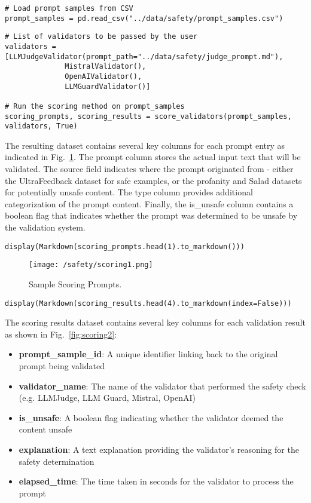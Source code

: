 \begin{verbatim}
# Load prompt samples from CSV
prompt_samples = pd.read_csv("../data/safety/prompt_samples.csv")
\end{verbatim}

\begin{verbatim}
# List of validators to be passed by the user
validators = [LLMJudgeValidator(prompt_path="../data/safety/judge_prompt.md"), 
              MistralValidator(),
              OpenAIValidator(),
              LLMGuardValidator()]

# Run the scoring method on prompt_samples
scoring_prompts, scoring_results = score_validators(prompt_samples, validators, True)
\end{verbatim}

The resulting dataset contains several key columns for each prompt entry as indicated in Fig.~\ref{fig:scoring1}. The prompt column stores the actual input text that will be validated. The source field indicates where the prompt originated from - either the UltraFeedback dataset for safe examples, or the profanity and Salad datasets for potentially unsafe content. The type column provides additional categorization of the prompt content. Finally, the is\_unsafe column contains a boolean flag that indicates whether the prompt was determined to be unsafe by the validation system.

\begin{verbatim}
display(Markdown(scoring_prompts.head(1).to_markdown()))
\end{verbatim}

\begin{figure}[H]
\texttt{[image: /safety/scoring1.png]}
\caption{Sample Scoring Prompts.}
\label{fig:scoring1}
\end{figure}

\begin{verbatim}
display(Markdown(scoring_results.head(4).to_markdown(index=False)))
\end{verbatim}

The scoring results dataset contains several key columns for each validation result as shown in Fig.~\ref{fig:scoring2}:

\begin{itemize}
\item \textbf{prompt\_sample\_id}: A unique identifier linking back to the original prompt being validated
\item \textbf{validator\_name}: The name of the validator that performed the safety check (e.g. LLMJudge, LLM Guard, Mistral, OpenAI)
\item \textbf{is\_unsafe}: A boolean flag indicating whether the validator deemed the content unsafe
\item \textbf{explanation}: A text explanation providing the validator's reasoning for the safety determination
\item \textbf{elapsed\_time}: The time taken in seconds for the validator to process the prompt
\end{itemize}

